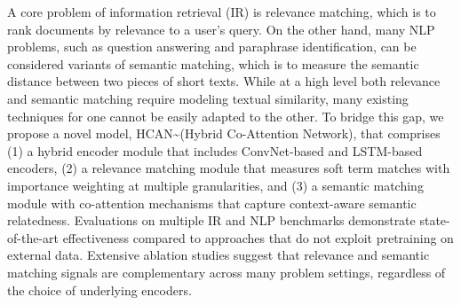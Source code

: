 A core problem of information retrieval (IR) is relevance matching, which is to rank documents by relevance to a user's query. On the other hand, many NLP problems, such as question answering and paraphrase identification, can be considered variants of semantic matching, which is to measure the semantic distance between two pieces of short texts. 
While at a high level both relevance and semantic matching require modeling textual similarity, many existing techniques for one cannot be easily adapted to the other. To bridge this gap, we propose a novel model, HCAN{\textasciitilde}(Hybrid Co-Attention Network),  that comprises (1) a hybrid encoder module that includes ConvNet-based and LSTM-based encoders, (2) a relevance matching module that measures soft term matches with importance weighting at multiple granularities, and (3) a semantic matching module with co-attention mechanisms that capture context-aware semantic relatedness. Evaluations on multiple IR and NLP benchmarks demonstrate state-of-the-art effectiveness compared to approaches that do not exploit pretraining on external data. Extensive ablation studies suggest that relevance and semantic matching signals are complementary across many problem settings, regardless of the choice of underlying encoders.
